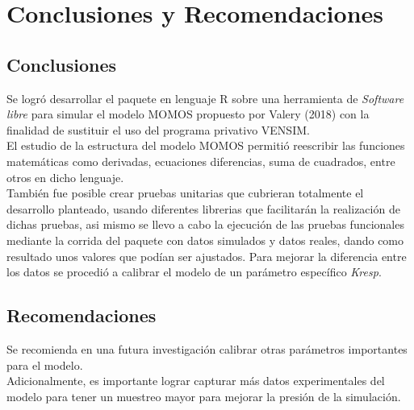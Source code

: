 \chapter{Conclusiones y Recomendaciones}

\section{Conclusiones}

Se logr\'o desarrollar el paquete en lenguaje R sobre una herramienta de \textit{Software libre} para simular el modelo MOMOS propuesto por Valery (2018) con la finalidad de sustituir el uso del programa privativo VENSIM.\\

El estudio de la estructura del modelo MOMOS permiti\'o reescribir las funciones matem\'aticas como derivadas, ecuaciones diferencias, suma de cuadrados, entre otros en dicho lenguaje.\\

Tambi\'en fue posible crear pruebas unitarias que cubrieran totalmente el desarrollo planteado, usando diferentes librerias que facilitar\'an la realizaci\'on de dichas pruebas, asi mismo se llevo a cabo la ejecuci\'on de las pruebas funcionales mediante la corrida del paquete con datos simulados y datos reales, dando como resultado unos valores que pod\'ian ser ajustados. Para mejorar la diferencia entre los datos se procedi\'o a calibrar el modelo de un par\'ametro espec\'ifico \textit{Kresp}.\\

\section{Recomendaciones}

Se recomienda en una futura investigaci\'on calibrar otras par\'ametros importantes para el modelo.\\

Adicionalmente, es importante lograr capturar m\'as datos experimentales del modelo para tener un muestreo mayor para mejorar la presi\'on de la simulaci\'on.